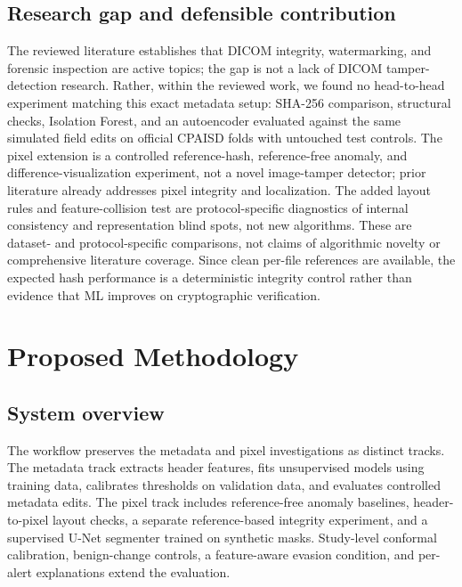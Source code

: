 \documentclass[journal]{IEEEtran}
\begin{document}
  \subsection{Research gap and defensible contribution}
  The reviewed literature establishes that DICOM integrity, watermarking, and forensic inspection are active topics; the gap is not a lack of DICOM tamper-detection research. Rather, within the reviewed work, we found no head-to-head experiment matching this exact metadata setup: SHA-256 comparison, structural checks, Isolation Forest, and an autoencoder evaluated against the same simulated field edits on official CPAISD folds with untouched test controls. The pixel extension is a controlled reference-hash, reference-free anomaly, and difference-visualization experiment, not a novel image-tamper detector; prior literature already addresses pixel integrity and localization. The added layout rules and feature-collision test are protocol-specific diagnostics of internal consistency and representation blind spots, not new algorithms. These are dataset- and protocol-specific comparisons, not claims of algorithmic novelty or comprehensive literature coverage. Since clean per-file references are available, the expected hash performance is a deterministic integrity control rather than evidence that ML improves on cryptographic verification.
  
  \section{Proposed Methodology}
  \subsection{System overview}
  The workflow preserves the metadata and pixel investigations as distinct tracks. The metadata track extracts header features, fits unsupervised models using training data, calibrates thresholds on validation data, and evaluates controlled metadata edits. The pixel track includes reference-free anomaly baselines, header-to-pixel layout checks, a separate reference-based integrity experiment, and a supervised U-Net segmenter trained on synthetic masks. Study-level conformal calibration, benign-change controls, a feature-aware evasion condition, and per-alert explanations extend the evaluation.
  
\end{document}
